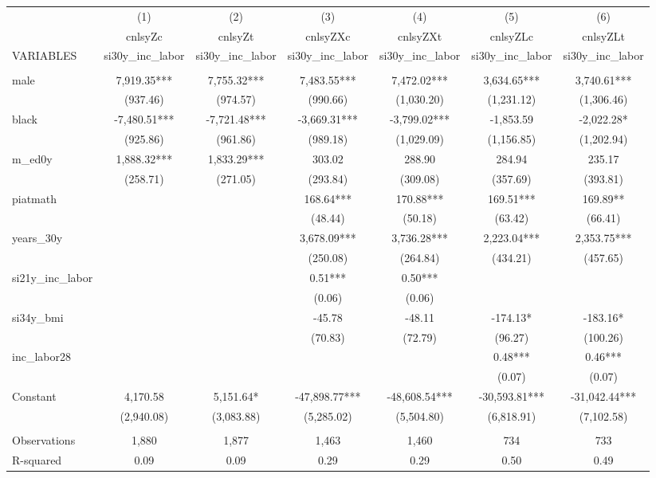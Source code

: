 \begin{tabular}{lcccccc} \hline
 & (1) & (2) & (3) & (4) & (5) & (6) \\
 & cnlsyZc & cnlsyZt & cnlsyZXc & cnlsyZXt & cnlsyZLc & cnlsyZLt \\
VARIABLES & si30y\_inc\_labor & si30y\_inc\_labor & si30y\_inc\_labor & si30y\_inc\_labor & si30y\_inc\_labor & si30y\_inc\_labor \\ \hline
 &  &  &  &  &  &  \\
male & 7,919.35*** & 7,755.32*** & 7,483.55*** & 7,472.02*** & 3,634.65*** & 3,740.61*** \\
 & (937.46) & (974.57) & (990.66) & (1,030.20) & (1,231.12) & (1,306.46) \\
black & -7,480.51*** & -7,721.48*** & -3,669.31*** & -3,799.02*** & -1,853.59 & -2,022.28* \\
 & (925.86) & (961.86) & (989.18) & (1,029.09) & (1,156.85) & (1,202.94) \\
m\_ed0y & 1,888.32*** & 1,833.29*** & 303.02 & 288.90 & 284.94 & 235.17 \\
 & (258.71) & (271.05) & (293.84) & (309.08) & (357.69) & (393.81) \\
piatmath &  &  & 168.64*** & 170.88*** & 169.51*** & 169.89** \\
 &  &  & (48.44) & (50.18) & (63.42) & (66.41) \\
years\_30y &  &  & 3,678.09*** & 3,736.28*** & 2,223.04*** & 2,353.75*** \\
 &  &  & (250.08) & (264.84) & (434.21) & (457.65) \\
si21y\_inc\_labor &  &  & 0.51*** & 0.50*** &  &  \\
 &  &  & (0.06) & (0.06) &  &  \\
si34y\_bmi &  &  & -45.78 & -48.11 & -174.13* & -183.16* \\
 &  &  & (70.83) & (72.79) & (96.27) & (100.26) \\
inc\_labor28 &  &  &  &  & 0.48*** & 0.46*** \\
 &  &  &  &  & (0.07) & (0.07) \\
Constant & 4,170.58 & 5,151.64* & -47,898.77*** & -48,608.54*** & -30,593.81*** & -31,042.44*** \\
 & (2,940.08) & (3,083.88) & (5,285.02) & (5,504.80) & (6,818.91) & (7,102.58) \\
 &  &  &  &  &  &  \\
Observations & 1,880 & 1,877 & 1,463 & 1,460 & 734 & 733 \\
 R-squared & 0.09 & 0.09 & 0.29 & 0.29 & 0.50 & 0.49 \\ \hline
\end{tabular}
